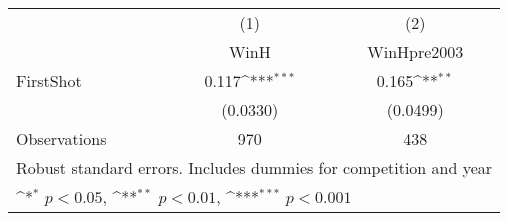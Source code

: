 {
\def\sym#1{\ifmmode^{#1}\else\(^{#1}\)\fi}
\begin{tabular}{l*{2}{c}}
\hline\hline
                    &\multicolumn{1}{c}{(1)}&\multicolumn{1}{c}{(2)}\\
                    &\multicolumn{1}{c}{WinH}&\multicolumn{1}{c}{WinHpre2003}\\
\hline
FirstShot           &       0.117\sym{***}&       0.165\sym{**} \\
                    &    (0.0330)         &    (0.0499)         \\
\hline
Observations        &         970         &         438         \\
\hline\hline
\multicolumn{3}{l}{\footnotesize Robust standard errors. Includes dummies for competition and year}\\
\multicolumn{3}{l}{\footnotesize \sym{*} \(p<0.05\), \sym{**} \(p<0.01\), \sym{***} \(p<0.001\)}\\
\end{tabular}
}
